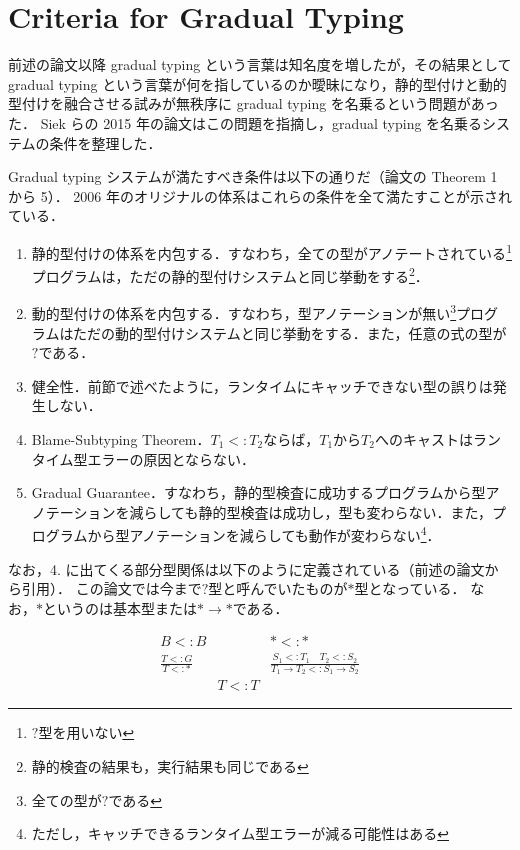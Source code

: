 \section{Criteria for Gradual Typing}

前述の論文以降 gradual typing という言葉は知名度を増したが，その結果として gradual typing という言葉が何を指しているのか曖昧になり，静的型付けと動的型付けを融合させる試みが無秩序に gradual typing を名乗るという問題があった．
Siek ら\cite{siek_et_al:LIPIcs.SNAPL.2015.274}の 2015 年の論文はこの問題を指摘し，gradual typing を名乗るシステムの条件を整理した．

Gradual typing システムが満たすべき条件は以下の通りだ（論文の Theorem 1 から 5）．
2006 年のオリジナルの体系はこれらの条件を全て満たすことが示されている．

\begin{enumerate}
    \item 静的型付けの体系を内包する．すなわち，全ての型がアノテートされている\footnote{$?$型を用いない}プログラムは，ただの静的型付けシステムと同じ挙動をする\footnote{静的検査の結果も，実行結果も同じである}．
    \item 動的型付けの体系を内包する．すなわち，型アノテーションが無い\footnote{全ての型が$?$である}プログラムはただの動的型付けシステムと同じ挙動をする．また，任意の式の型が$?$である．
    \item 健全性．前節で述べたように，ランタイムにキャッチできない型の誤りは発生しない．
    \item Blame-Subtyping Theorem．$T_1 <: T_2$ならば，$T_1$から$T_2$へのキャストはランタイム型エラーの原因とならない．
    \item Gradual Guarantee．すなわち，静的型検査に成功するプログラムから型アノテーションを減らしても静的型検査は成功し，型も変わらない．また，プログラムから型アノテーションを減らしても動作が変わらない\footnote{ただし，キャッチできるランタイム型エラーが減る可能性はある}．
\end{enumerate}

なお，4. に出てくる部分型関係は以下のように定義されている（前述の論文\cite{siek_et_al:LIPIcs.SNAPL.2015.274}から引用）．
この論文では今まで$?$型と呼んでいたものが$*$型となっている．
なお，$*$というのは基本型または$* \to *$である．

\[
    \begin{array}{ccc}
        B <: B                & \quad          & * <: *                                                         \\[1em]
        \frac{T <: G}{T <: *} & \quad          & \frac{S_1 <: T_1 \quad T_2 <: S_2}{T_1 \to T_2 <: S_1 \to S_2} \\[2em]
                              & \boxed{T <: T} &
    \end{array}
\]

